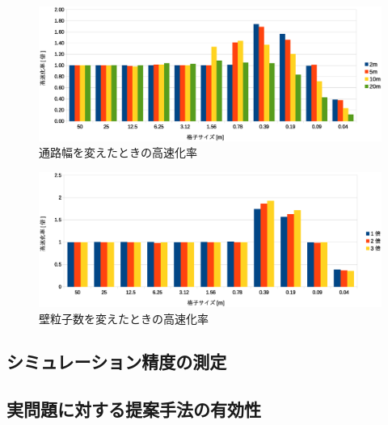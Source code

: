 \begin{figure}[tb]
 \begin{center}
  \includegraphics[width=12.5cm,clip]{figure/5_kousokukaritu.eps}
  \caption{通路幅を変えたときの高速化率}
  \label{fig:5_kousokuka_haba}
 \end{center}
\end{figure}


\begin{figure}[tb]
 \begin{center}
  \includegraphics[width=12.5cm,clip]{figure/5_bai_kousokukaritu.eps}
  \caption{壁粒子数を変えたときの高速化率}
  \label{fig:5_kousokuka_atusa}
 \end{center}
\end{figure}


\clearpage
\subsection{シミュレーション精度の測定}


\clearpage
\subsection{実問題に対する提案手法の有効性}


